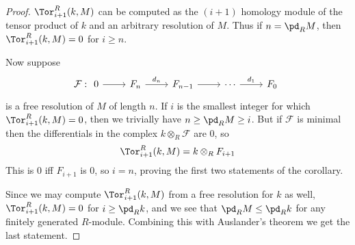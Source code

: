 \begin{proof}
$\Tor^R_{i+1}(k,M)$ can be computed as the $(i+1)$ homology module of the
tensor product of $k$ and an arbitrary resolution of $M$. Thus if $n=\pd_RM$, then $\Tor^R_{i+1}(k,M)=0$ for $i\geq n$.\par
Now suppose
\[\mathcal{F}:\begin{tikzcd}
0\ar[r]&F_n\ar[r,"d_n"]&F_{n-1}\ar[r]&\cdots\ar[r,"d_1"]&F_0
\end{tikzcd}\]
is a free resolution of $M$ of length $n$. If $i$ is the smallest integer for which $\Tor_{i+1}^R(k,M)=0$, then we trivially have $n\geq\pd_RM\geq i$. But if $\mathcal{F}$ is minimal then the differentials in the complex $k\otimes_R\mathcal{F}$ are $0$, so
\[\Tor^R_{i+1}(k,M)=k\otimes_RF_{i+1}\]
This is $0$ iff $F_{i+1}$ is $0$, so $i=n$, proving the first two statements of the corollary.\par
Since we may compute $\Tor^R_{i+1}(k,M)$ from a free resolution for $k$ as well, $\Tor_{i+1}^R(k,M)=0$ for $i\geq\pd_Rk$, and we see that $\pd_RM\leq\pd_Rk$ for any finitely generated $R$-module. Combining this with Auslander's theorem we get the last statement.
\end{proof}
